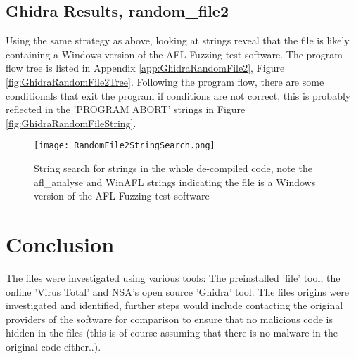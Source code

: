 \documentclass[
	letterpaper, %
	10pt, %
	unnumberedsections, %
	twoside, %
]{APAAssignment}
\begin{document}
\subsection{Ghidra Results, random\_file2}
Using the same strategy as above, looking at strings reveal that the file is likely containing a Windows version of the AFL Fuzzing test software. The program flow tree is listed in Appendix \ref{app:GhidraRandomFile2}, Figure \ref{fig:GhidraRandomFile2Tree}. Following the program flow, there are some conditionals that exit the program if conditions are not correct, this is probably reflected in the 'PROGRAM ABORT' strings in Figure \ref{fig:GhidraRandomFileString}.   
\begin{figure}[!htp] %
	\centering
	\texttt{[image: RandomFile2StringSearch.png]}
	\caption{String search for strings in the whole de-compiled code, note the afl\_analyse and WinAFL strings indicating the file is a Windows version of the AFL Fuzzing test software}
	\label{fig:GhidraRandomFile2StringSearch}
\end{figure}

\section{Conclusion}
The files were investigated using various tools: The preinstalled 'file' tool, the online 'Virus Total' and NSA's open source 'Ghidra' tool. The files origins were investigated and identified, further steps would include contacting the original providers of the software for comparison to ensure that no malicious code is hidden in the files (this is of course assuming that there is no malware in the original code either..).  

\clearpage
\printbibliography %





\appendix


\clearpage
\end{document}
